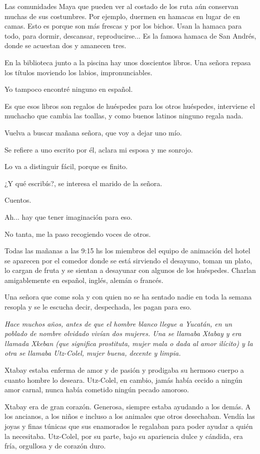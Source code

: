 \documentclass[11pt,twoside,openright,a6paper]{book}
\begin{document}
\vspace{1.5cm}
Las comunidades Maya que pueden ver al costado de los ruta aún conservan muchas de sus costumbres. Por ejemplo, duermen en hamacas en lugar de en camas. Esto es porque son más frescas y por los bichos. Usan la hamaca para todo, para dormir, descansar, reproducirse... Es la famosa hamaca de San Andrés, donde se acuestan dos y amanecen tres.


\vspace{1.5cm}
En la biblioteca junto a la piscina hay unos doscientos libros.
Una señora repasa los títulos moviendo los labios, impronunciables.

Yo tampoco encontré ninguno en español.

Es que esos libros son regalos de huéspedes para los otros huéspedes, interviene el muchacho que cambia las toallas, y como buenos latinos ninguno regala nada.

Vuelva a buscar mañana señora, que voy a dejar uno mío.

Se refiere a uno escrito por él, aclara mi esposa y me sonrojo.

Lo va a distinguir fácil, porque es finito.

¿Y qué escribís?, se interesa el marido de la señora.

Cuentos.

Ah... hay que tener imaginación para eso.

No tanta, me la paso recogiendo voces de otros.


\vspace{1.5cm}
Todas las mañanas a las 9:15 hs los miembros del equipo de animación del hotel se aparecen por el comedor donde se está sirviendo el desayuno, toman un plato, lo cargan de fruta y se sientan a desayunar con algunos de los huéspedes. Charlan amigablemente en español, inglés, alemán o francés.

Una señora que come sola y con quien no se ha sentado nadie en toda la semana resopla y se le escucha decir, despechada, les pagan para eso.


\vspace{1.5cm}
{\em Hace muchos años, antes de que el hombre blanco llegue a Yucatán, en un poblado de nombre olvidado vivían dos mujeres. Una se llamaba Xtabay y era llamada Xkeban (que significa prostituta, mujer mala o dada al amor ilícito) y la otra se llamaba Utz-Colel, mujer buena, decente y limpia.

Xtabay estaba enferma de amor y de pasión y prodigaba su hermoso cuerpo a cuanto hombre lo deseara. Utz-Colel, en cambio, jamás había cecido a ningún amor carnal, nunca había cometido ningún pecado amoroso.

Xtabay era de gran corazón. Generosa, siempre estaba ayudando a los demás. A los ancianos, a los niños e incluso a los animales que otros desechaban. Vendía las joyas y finas túnicas que sus enamorados le regalaban para poder ayudar a quién la necesitaba. Utz-Colel, por su parte, bajo su apariencia dulce y cándida, era fría, orgullosa y de corazón duro.}
\end{document}
